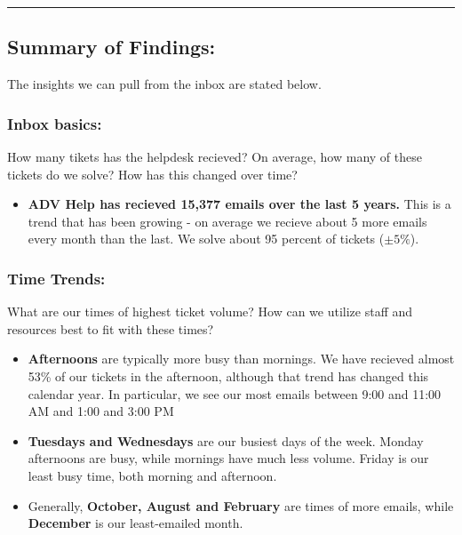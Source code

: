 \documentclass[11pt]{article}
\providecommand{\tightlist}{%
      \setlength{\itemsep}{0pt}\setlength{\parskip}{0pt}}
\begin{document}
    \begin{center}\rule{0.5\linewidth}{\linethickness}\end{center}

\hypertarget{summary-of-findings}{%
\subsection{Summary of Findings:}\label{summary-of-findings}}

The insights we can pull from the inbox are stated below.

\hypertarget{inbox-basics}{%
\subsubsection{Inbox basics:}\label{inbox-basics}}

How many tikets has the helpdesk recieved? On average, how many of these
tickets do we solve? How has this changed over time?

\begin{itemize}
\tightlist
\item
  \textbf{ADV Help has recieved 15,377 emails over the last 5 years.}
  This is a trend that has been growing - on average we recieve about 5
  more emails every month than the last. We solve about 95 percent of
  tickets (\(\pm5 \%\)).
\end{itemize}

\hypertarget{time-trends}{%
\subsubsection{Time Trends:}\label{time-trends}}

What are our times of highest ticket volume? How can we utilize staff
and resources best to fit with these times?

\begin{itemize}
\item
  \textbf{Afternoons} are typically more busy than mornings. We have
  recieved almost 53\% of our tickets in the afternoon, although that
  trend has changed this calendar year. In particular, we see our most
  emails between 9:00 and 11:00 AM and 1:00 and 3:00 PM 
\item
  \textbf{Tuesdays and Wednesdays} are our busiest days of the week.
  Monday afternoons are busy, while mornings have much less volume.
  Friday is our least busy time, both morning and afternoon. 
\item
  Generally, \textbf{October, August and February} are times of more
  emails, while \textbf{December} is our least-emailed month.
\end{itemize}
\end{document}
